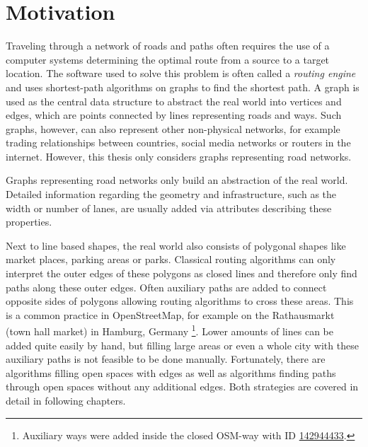 
\section{Motivation}
	
	Traveling through a network of roads and paths often requires the use of a computer systems determining the optimal route from a source to a target location.
	The software used to solve this problem is often called a \emph{routing engine} and uses shortest-path algorithms on graphs to find the shortest path.
	A graph is used as the central data structure to abstract the real world into vertices and edges, which are points connected by lines representing roads and ways.
	Such graphs, however, can also represent other non-physical networks, for example trading relationships between countries, social media networks or routers in the internet.
	However, this thesis only considers graphs representing road networks.
	
	Graphs representing road networks only build an abstraction of the real world.
	Detailed information regarding the geometry and infrastructure, such as the width or number of lanes, are usually added via attributes describing these properties.
	
	Next to line based shapes, the real world also consists of polygonal shapes like market places, parking areas or parks.
	Classical routing algorithms can only interpret the outer edges of these polygons as closed lines and therefore only find paths along these outer edges.
	Often auxiliary paths are added to connect opposite sides of polygons allowing routing algorithms to cross these areas.
	This is a common practice in OpenStreetMap, for example on the Rathausmarkt (town hall market) in Hamburg, Germany \footnote{Auxiliary ways were added inside the closed OSM-way with ID  \href{https://www.openstreetmap.org/way/142944433}{142944433}.}.
	Lower amounts of lines can be added quite easily by hand, but filling large areas or even a whole city with these auxiliary paths is not feasible to be done manually.
	Fortunately, there are algorithms filling open spaces with edges as well as algorithms finding paths through open spaces without any additional edges.
	Both strategies are covered in detail in following chapters.
	
